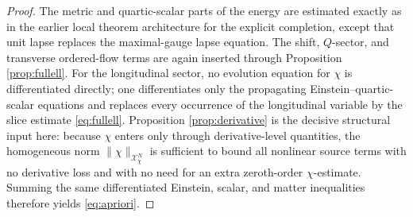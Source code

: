 \documentclass[11pt]{article}
\begin{document}
\begin{proof}
The metric and quartic-scalar parts of the energy are estimated exactly as in the earlier local theorem architecture for the explicit completion, except that unit lapse replaces the maximal-gauge lapse equation. The shift, \(Q\)-sector, and transverse ordered-flow terms are again inserted through Proposition \ref{prop:fullell}. For the longitudinal sector, no evolution equation for \(\chi\) is differentiated directly; one differentiates only the propagating Einstein--quartic-scalar equations and replaces every occurrence of the longitudinal variable by the slice estimate \eqref{eq:fullell}. Proposition \ref{prop:derivative} is the decisive structural input here: because \(\chi\) enters only through derivative-level quantities, the homogeneous norm \(\|\chi\|_{\mathcal X_\chi^N}\) is sufficient to bound all nonlinear source terms with no derivative loss and with no need for an extra zeroth-order \(\chi\)-estimate. Summing the same differentiated Einstein, scalar, and matter inequalities therefore yields \eqref{eq:apriori}.
\end{proof}
\end{document}
